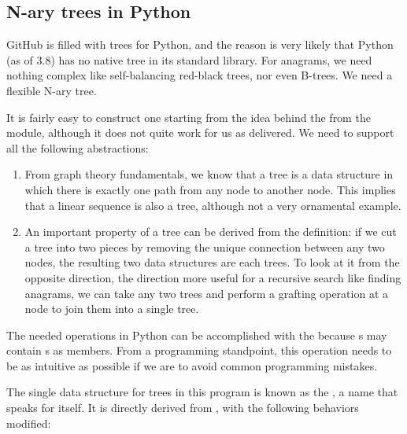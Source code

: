\documentclass[letterpaper, 11pt]{article}
\begin{document}
\subsection{N-ary trees in Python}

GitHub is filled with trees for Python, and the reason is very
likely that Python (as of 3.8) has no native tree in its standard
library.  For anagrams, we need nothing complex like self-balancing
red-black trees, nor even B-trees. We need a flexible N-ary tree.

It is fairly easy to construct one starting from the idea behind
the  from the  module, although
it does not quite work for us as delivered. We need to support all
the following abstractions:

\begin{enumerate}
\item From graph theory fundamentals, we know that a tree is a data
structure in which there is exactly one path from any node to another
node. This implies that a linear sequence is also a tree, although
not a very ornamental example.

\item An important property of a tree can be derived from the
definition: if we cut a tree into two pieces by removing the unique
connection between any two nodes, the resulting two data structures
are each trees. To look at it from the opposite direction, the
direction more useful for a recursive search like finding anagrams,
we can take any two trees and perform a grafting operation at a
node to join them into a single tree.

\end{enumerate}

The needed operations in Python can be accomplished with the
 because s may contain s as members.
From a programming standpoint, this operation needs to be as intuitive
as possible if we are to avoid common programming mistakes.

The single data structure for trees in this program is known as 
the , a name that speaks for itself. It is directly
derived from , with the following behaviors modified:
\end{document}
